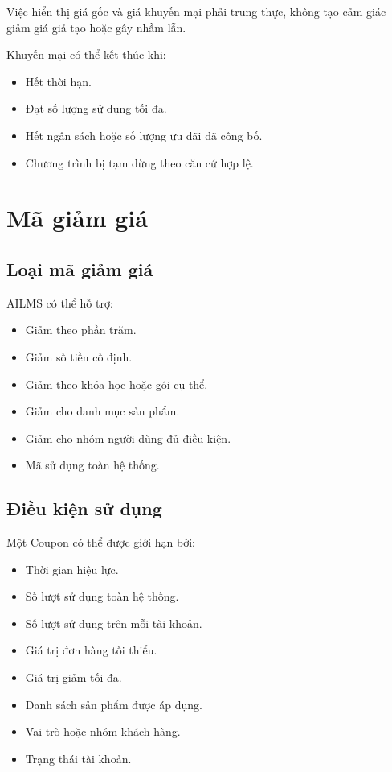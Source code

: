 \documentclass[12pt,a4paper]{article}
\begin{document}
Việc hiển thị giá gốc và giá khuyến mại phải trung thực,
không tạo cảm giác giảm giá giả tạo hoặc gây nhầm lẫn.

Khuyến mại có thể kết thúc khi:

\begin{itemize}
    \item Hết thời hạn.
    \item Đạt số lượng sử dụng tối đa.
    \item Hết ngân sách hoặc số lượng ưu đãi đã công bố.
    \item Chương trình bị tạm dừng theo căn cứ hợp lệ.
\end{itemize}

\section{Mã giảm giá}

\subsection{Loại mã giảm giá}

AILMS có thể hỗ trợ:

\begin{itemize}
    \item Giảm theo phần trăm.
    \item Giảm số tiền cố định.
    \item Giảm theo khóa học hoặc gói cụ thể.
    \item Giảm cho danh mục sản phẩm.
    \item Giảm cho nhóm người dùng đủ điều kiện.
    \item Mã sử dụng toàn hệ thống.
\end{itemize}

\subsection{Điều kiện sử dụng}

Một Coupon có thể được giới hạn bởi:

\begin{itemize}
    \item Thời gian hiệu lực.
    \item Số lượt sử dụng toàn hệ thống.
    \item Số lượt sử dụng trên mỗi tài khoản.
    \item Giá trị đơn hàng tối thiểu.
    \item Giá trị giảm tối đa.
    \item Danh sách sản phẩm được áp dụng.
    \item Vai trò hoặc nhóm khách hàng.
    \item Trạng thái tài khoản.
\end{itemize}
\end{document}
